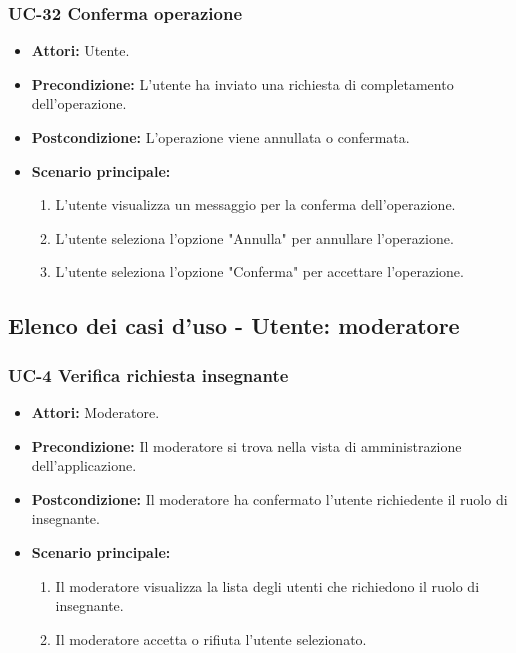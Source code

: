 \subsubsection{UC-32 Conferma operazione}		
\begin{itemize}
	\item \textbf{Attori:} Utente.
	\item \textbf{Precondizione:} L'utente ha inviato una richiesta di completamento dell'operazione.
	\item \textbf{Postcondizione:} L'operazione viene annullata o confermata.
	\item \textbf{Scenario principale:}
	\begin{enumerate}
		\item L'utente visualizza un messaggio per la conferma dell'operazione.
		\item L'utente seleziona l'opzione "Annulla" per annullare l'operazione.
		\item L'utente seleziona l'opzione "Conferma" per accettare l'operazione.
	\end{enumerate}		
\end{itemize}


\subsection{Elenco dei casi d'uso - Utente: moderatore}	
\subsubsection{UC-4 Verifica richiesta insegnante}
		\begin{itemize}
			\item \textbf{Attori:} Moderatore.
			\item \textbf{Precondizione:} Il moderatore si trova nella vista di amministrazione dell'applicazione.
			\item \textbf{Postcondizione:} Il moderatore ha confermato l'utente richiedente il ruolo di insegnante.
			\item \textbf{Scenario principale:}
				\begin{enumerate}
					\item Il moderatore visualizza la lista degli utenti che richiedono il ruolo di insegnante.
					\item Il moderatore accetta o rifiuta l'utente selezionato.
				\end{enumerate}
			
		\end{itemize}
		
